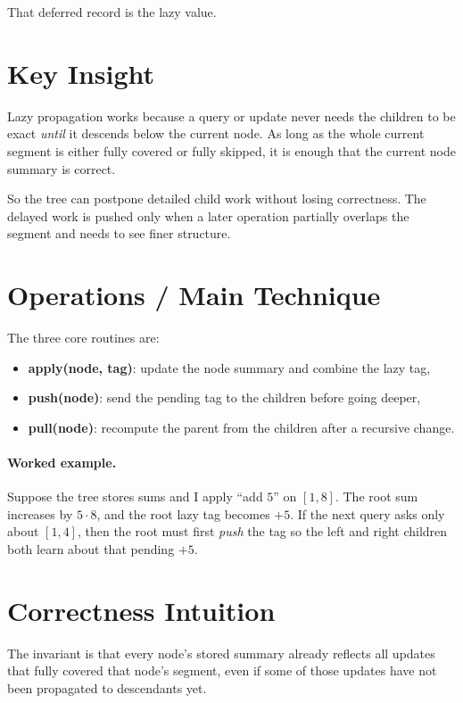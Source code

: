 That deferred record is the lazy value.

\section*{Key Insight}

Lazy propagation works because a query or update never needs the children to be exact \emph{until} it descends below
the current node. As long as the whole current segment is either fully covered or fully skipped, it is enough that the
current node summary is correct.

So the tree can postpone detailed child work without losing correctness. The delayed work is pushed only when a later
operation partially overlaps the segment and needs to see finer structure.

\section*{Operations / Main Technique}

The three core routines are:

\begin{itemize}
  \item \textbf{apply(node, tag)}: update the node summary and combine the lazy tag,
  \item \textbf{push(node)}: send the pending tag to the children before going deeper,
  \item \textbf{pull(node)}: recompute the parent from the children after a recursive change.
\end{itemize}

\paragraph{Worked example.}
Suppose the tree stores sums and I apply ``add \(5\)'' on \([1, 8]\). The root sum increases by \(5 \cdot 8\), and the
root lazy tag becomes \(+5\). If the next query asks only about \([1, 4]\), then the root must first \emph{push} the
tag so the left and right children both learn about that pending \(+5\).

\section*{Correctness Intuition}

The invariant is that every node's stored summary already reflects all updates that fully covered that node's segment,
even if some of those updates have not been propagated to descendants yet.

